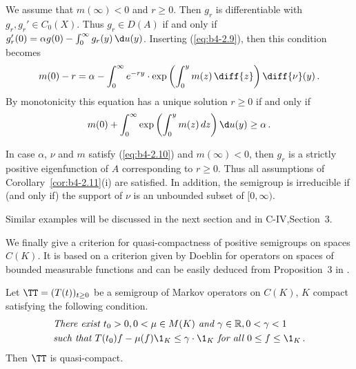 We assume that $m(\infty) < 0$ and $r \geq 0$. Then $g_r$ is differentiable with $g_r, g_r' \in C_{0}(X)$. Thus $g_r \in D(A)$ if and only if $g_r'(0) = \alpha g(0) - \int_0^{\infty} g_r(y) \, \d
u(y)$. Inserting (\ref{eq:b4-2.9}), then this condition becomes
\[
m(0) - r = \alpha - \int_0^{\infty} e^{-ry} \cdot \exp\left(\int_{0}^{y}  m(z) \,\diff{z}\right)\diff{\nu}(y)\,.
\]
By monotonicity this equation has a unique solution $r \geq 0$ if and only if
\begin{equation}\label{eq:b4-2.10}
	m(0) + \int_0^{\infty} \exp\left(\int_0^y m(z) \, dz\right)\d
u(y) \geq \alpha\,.
\end{equation}

In case $\alpha$, $\nu$ and $m$ satisfy (\ref{eq:b4-2.10}) and $m(\infty) < 0$, then $g_r$ is a strictly positive eigenfunction of $A$ corresponding to $r \geq 0$. Thus all assumptions of Corollary~\ref{cor:b4-2.11}(i) are satisfied. In addition, the semigroup is irreducible if (and only if) the support of $\nu$ is an unbounded subset of $[0,\infty)$.

Similar examples will be discussed in the next section and in  C-IV,Section~3.

We finally give a criterion for quasi-compactness of positive semigroups on spaces $C(K)$. It is based on a criterion given by Doeblin for operators on spaces of bounded measurable functions and can be easily deduced from  Proposition~3 in \citet{lotz:1981}.
\begin{proposition}\label{prop:b4-2.13}
	Let $\TT = (T(t))_{t \geq 0}$ be a semigroup of Markov operators on $C(K)$, $K$ compact satisfying the following condition.
	\begin{equation}\label{eq:b4-2.12}	
		\begin{aligned}		
		&\textit{There exist } t_{0} > 0, 0 < \mu \in M(K) \textit{ and }  \gamma \in \mathbb{R}, 0 < \gamma < 1 \\
		&\textit{such that } T(t_{0})f - \mu(f)\1_K \leq \gamma \cdot \1_K \textit{ for all }  0 \leq f \leq \1_K\,.
		\end{aligned}
	\end{equation}
	Then $\TT$ is quasi-compact.
\end{proposition}
%
%
%
\newpage
